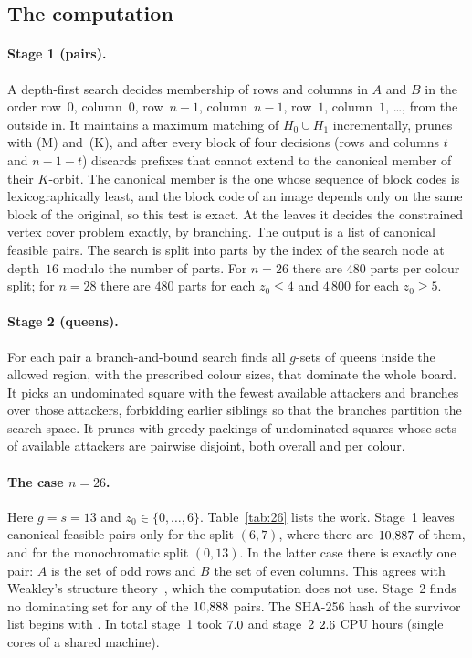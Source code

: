 \documentclass[11pt]{article}
\theoremstyle{definition}
\theoremstyle{remark}
\begin{document}
\subsection{The computation}\label{sec:comp}

\paragraph{Stage 1 (pairs).} A depth-first search decides membership of rows and columns in $A$ and $B$
in the order row~$0$, column~$0$, row~$n{-}1$, column~$n{-}1$, row~$1$, column~$1$, \dots, from the
outside in. It maintains a maximum matching of $H_0\cup H_1$ incrementally, prunes with (M) and~(K),
and after every block of four decisions (rows and columns $t$ and $n-1-t$) discards prefixes that
cannot extend to the canonical member of their $K$-orbit. The canonical member is the one whose
sequence of block codes is lexicographically least, and the block code of an image depends only on the
same block of the original, so this test is exact. At the leaves it decides the constrained vertex
cover problem exactly, by branching. The output is a list of canonical feasible pairs. The search is
split into parts by the index of the search node at depth~$16$ modulo the number of parts. For $n=26$
there are $480$ parts per colour split; for $n=28$ there are $480$ parts for each $z_0\le4$ and $4\,800$
for each $z_0\ge5$.

\paragraph{Stage 2 (queens).} For each pair a branch-and-bound search finds all $g$-sets of queens
inside the allowed region, with the prescribed colour sizes, that dominate the whole board. It picks an
undominated square with the fewest available attackers and branches over those attackers, forbidding
earlier siblings so that the branches partition the search space. It prunes with greedy packings of
undominated squares whose sets of available attackers are pairwise disjoint, both overall and per colour.

\paragraph{The case $n=26$.} Here $g=s=13$ and $z_0\in\{0,\dots,6\}$. Table~\ref{tab:26} lists the work.
Stage~1 leaves canonical feasible pairs only for the split $(6,7)$, where there are $10{,}887$ of
them, and for the monochromatic split $(0,13)$. In the latter case there is exactly one pair: $A$ is the
set of odd rows and $B$ the set of even columns. This agrees with Weakley's structure
theory~\cite{Weakley2022}, which the computation does not use. Stage~2 finds no dominating set for any
of the $10{,}888$ pairs. The SHA-256 hash of the survivor list begins with \texttt{\clsurvSha}.
In total stage~1 took $7.0$ and stage~2 $2.6$ CPU hours (single cores of a shared
machine).
\end{document}
